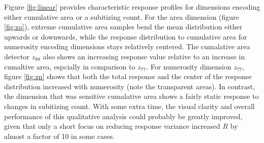 \documentclass[twocolumn]{article}
\begin{document}
{Figure \ref{fig:linear}  provides characteristic response profiles for dimensions
encoding either cumulative area or a subitizing count. For the area
dimension (figure \ref{fig:za}), extreme cumulative area samples bend the mean distribution
either upwards or downwards, while the response distribution to
cumulative area for numerosity encoding dimensions stays relatively
centered. The cumalative area detector \(z_{88}\) also shows an increasing response value relative to an increase in cumaltive area, espcially in comparison to \(z_{77}\). For numerosity dimension \(z_{77}\), figure \ref{fig:zn} shows that both the total response and the center of the response distribution increased with
numerosity (note the transparent areas). In contrast, the dimension that was sensitive cumalative area shows a fairly
static response to changes in subitizing count. With some extra time,
the visual clarity and overall performance of this qualitative analysis
could probably be greatly improved, given that only a short focus on
reducing response variance increased \(R\) by almost a factor of 10 in
some cases.

}
\end{document}
